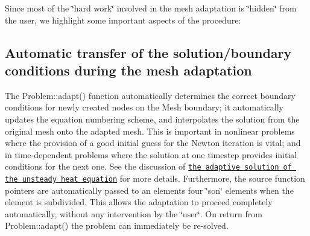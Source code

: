 Since most of the \char`\"{}hard work\char`\"{} involved in the mesh adaptation is \char`\"{}hidden\char`\"{} from the user, we highlight some important aspects of the procedure\+:\hypertarget{index_adapt_bc}{}\subsection{Automatic transfer of the solution/boundary conditions during the mesh adaptation}\label{index_adapt_bc}
The {\ttfamily Problem\+::adapt()} function automatically determines the correct boundary conditions for newly created nodes on the Mesh boundary; it automatically updates the equation numbering scheme, and interpolates the solution from the original mesh onto the adapted mesh. This is important in nonlinear problems where the provision of a good initial guess for the Newton iteration is vital; and in time-\/dependent problems where the solution at one timestep provides initial conditions for the next one. See the discussion of \href{../../../unsteady_heat/two_d_unsteady_heat_adapt/html/index.html}{\tt the adaptive solution of the unsteady heat equation} for more details. Furthermore, the source function pointers are automatically passed to an element\textquotesingle{}s four \char`\"{}son\char`\"{} elements when the element is subdivided. This allows the adaptation to proceed completely automatically, without any intervention by the \char`\"{}user\char`\"{}. On return from {\ttfamily Problem\+::adapt()} the problem can immediately be re-\/solved.

